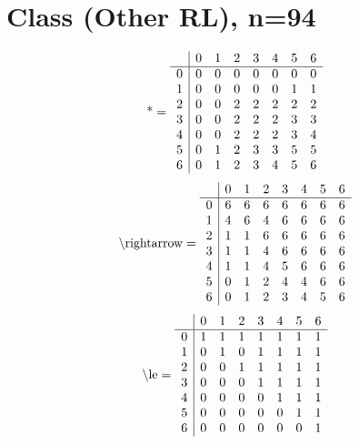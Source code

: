\documentclass[11pt]{article}
\begin{document}
\section{Class (Other RL), n=94}
\[\text{*} = 
\begin{array}{r | r r r r r r r}
 & 0 & 1 & 2 & 3 & 4 & 5 & 6 \\ \hline
0 & 0 & 0 & 0 & 0 & 0 & 0 & 0 \\
1 & 0 & 0 & 0 & 0 & 0 & 1 & 1 \\
2 & 0 & 0 & 2 & 2 & 2 & 2 & 2 \\
3 & 0 & 0 & 2 & 2 & 2 & 3 & 3 \\
4 & 0 & 0 & 2 & 2 & 2 & 3 & 4 \\
5 & 0 & 1 & 2 & 3 & 3 & 5 & 5 \\
6 & 0 & 1 & 2 & 3 & 4 & 5 & 6 \\
\end{array}
\]
\[\text{\textbackslash rightarrow} = 
\begin{array}{r | r r r r r r r}
 & 0 & 1 & 2 & 3 & 4 & 5 & 6 \\ \hline
0 & 6 & 6 & 6 & 6 & 6 & 6 & 6 \\
1 & 4 & 6 & 4 & 6 & 6 & 6 & 6 \\
2 & 1 & 1 & 6 & 6 & 6 & 6 & 6 \\
3 & 1 & 1 & 4 & 6 & 6 & 6 & 6 \\
4 & 1 & 1 & 4 & 5 & 6 & 6 & 6 \\
5 & 0 & 1 & 2 & 4 & 4 & 6 & 6 \\
6 & 0 & 1 & 2 & 3 & 4 & 5 & 6 \\
\end{array}
\]
\[\text{\textbackslash le} = 
\begin{array}{r | r r r r r r r}
 & 0 & 1 & 2 & 3 & 4 & 5 & 6 \\ \hline
0 & 1 & 1 & 1 & 1 & 1 & 1 & 1 \\
1 & 0 & 1 & 0 & 1 & 1 & 1 & 1 \\
2 & 0 & 0 & 1 & 1 & 1 & 1 & 1 \\
3 & 0 & 0 & 0 & 1 & 1 & 1 & 1 \\
4 & 0 & 0 & 0 & 0 & 1 & 1 & 1 \\
5 & 0 & 0 & 0 & 0 & 0 & 1 & 1 \\
6 & 0 & 0 & 0 & 0 & 0 & 0 & 1 \\
\end{array}
\]
\end{document}
